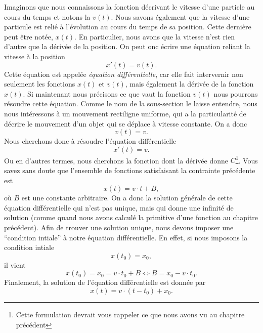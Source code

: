 \documentclass[a4paper,12pt]{book}
\begin{document}
Imaginons que nous connaissons la fonction décrivant le vitesse d'une particle au cours du temps et 
notons la $v(t)$. Nous savons également que la vitesse d'une particule est relié à l'évolution au cours du temps 
de sa position. Cette dernière peut être notée, $x(t)$.
En particulier, nous avons que la vitesse n'est rien d'autre que la dérivée de la position. On peut onc écrire 
une équation reliant la vitesse à la position
\begin{equation}
 x'(t)=v(t).
\end{equation}
Cette équation est appelée \textit{équation différentielle}, car elle fait intervernir non seulement les fonctions $x(t)$ et $v(t)$, mais également 
la dérivée de la fonction $x(t)$. Si maintenant nous précisons ce que vaut la fonction $v(t)$ nous pourrons résoudre cette équation.
Comme le nom de la sous-section le laisse entendre, nous nous intéressons à un mouvement rectiligne uniforme, qui a la particularité
de décrire le mouvement d'un objet qui se déplace à vitesse constante. On a donc
\begin{equation}
 v(t)=v.
\end{equation}
Nous cherchons donc à résoudre l'équation différentielle
\begin{equation}
 x'(t)=v.
\end{equation}
Ou en d'autres termes, nous cherchons la fonction dont la dérivée donne $C$\footnote{Cette formulation devrait vous rappeler ce que nous avons vu au chapitre précédent}. 
Vous savez sans doute que l'ensemble de fonctions satisfaisant la contrainte précédente est
\begin{equation}
 x(t)=v\cdot t+B,
\end{equation}
où $B$ est une constante arbitraire. On a donc la solution générale de cette équation différentielle qui n'est pas unique, mais qui donne une infinité
de solution (comme quand nous avons calculé la primitive d'une fonction au chapitre précédent). Afin de trouver une solution unique,
nous devons imposer une ``condition intiale'' à notre équation différentielle. En effet, si nous imposons la condition intiale
\begin{equation}
 x(t_0)=x_0, 
\end{equation}
il vient
\begin{equation}
 x(t_0)=x_0=v\cdot t_0+B \Leftrightarrow B=x_0-v\cdot t_0.
\end{equation}
Finalement, la solution de l'équation différentielle est donnée par
\begin{equation}
 x(t)=v\cdot (t-t_0)+x_0.
\end{equation}
\end{document}
